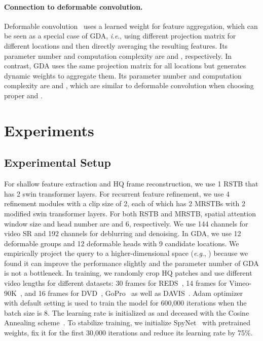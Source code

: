 \documentclass{article}
\newcommand{\ie}{\textit{i}.\textit{e}.}
\newcommand{\eg}{\textit{e}.\textit{g}.}
\newlength \g
\begin{document}
\vspace{-0.3cm}
\paragraph{Connection to deformable convolution.} Deformable convolution~\cite{dai2017deformable, zhu2019deformable} uses a learned weight for feature aggregation, which can be seen as a special case of GDA, \ie, using different projection matrix  for different locations and then directly averaging the resulting features. Its parameter number and computation complexity are  and , respectively. In contrast, GDA uses the same projection matrix for all locations but generates dynamic weights to aggregate them. Its parameter number and computation complexity are  and , which are similar to deformable convolution when choosing proper  and .



\section{Experiments}
\subsection{Experimental Setup}
\label{sec:exp_setup}
For shallow feature extraction and HQ frame reconstruction, we use 1 RSTB that has 2 swin transformer layers. For recurrent feature refinement, we use 4 refinement modules with a clip size of 2, each of which has 2 MRSTBs with 2 modified swin transformer layers. For both RSTB and MRSTB, spatial attention window size and head number are  and 6, respectively. We use 144 channels for video SR and 192 channels for deblurring and denoising. In GDA, we use 12 deformable groups and 12 deformable heads with 9 candidate locations. We empirically project the query to a higher-dimensional space (\eg, ) because we found it can improve the performance slightly and the parameter number of GDA is not a bottleneck. In training, we randomly crop  HQ patches and use different video lengths for different datasets: 30 frames for REDS~\cite{nah2019ntireREDS}, 14 frames for Vimeo-90K~\cite{xue2019TOFlow-Vimeo-90K}, and 16 frames for DVD~\cite{su2017dvddeblur}, GoPro~\cite{nah2017Gopro} as well as DAVIS~\cite{khoreva2018davis}. Adam optimizer~\cite{kingma2014adam} with default setting is used to train the model for 600,000 iterations when the batch size is 8. The learning rate is initialized as  and deceased with the Cosine Annealing scheme~\cite{loshchilov2016sgdrConsine}. To stabilize training, we initialize SpyNet~\cite{ranjan2017spynet, pytorch-spynet} with pretrained weights, fix it for the first 30,000 iterations and reduce its learning rate by 75\%.
\end{document}
